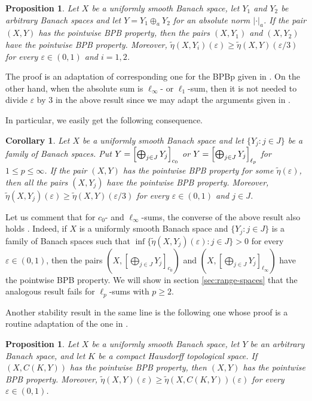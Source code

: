 \documentclass[a4paper,10pt]{amsart}
\theoremstyle{plain}
\newtheorem{corollary}[theorem]{Corollary}
\newtheorem{proposition}[theorem]{Proposition}
\theoremstyle{definition}
\newcommand{\eps}{\varepsilon}
\renewcommand{\geq}{\geqslant}
\renewcommand{\leq}{\leqslant}
\begin{document}
\begin{proposition} \label{prop:abssumrange:pointwise BPB property} Let $X$ be a uniformly smooth Banach space, let $Y_1$ and $Y_2$ be arbitrary Banach spaces and let $Y=Y_1\oplus_a Y_2$ for an absolute norm $|  \cdot  |_a$. If the pair $(X, Y)$ has the pointwise BPB property, then the pairs $(X, Y_1)$ and $(X, Y_2)$ have the pointwise BPB property. Moreover, $\tilde\eta(X,Y_i)(\eps)\geq \tilde\eta(X,Y)(\eps/3)$ for every $\eps\in (0,1)$ and $i=1,2$.
\end{proposition}

The proof is an adaptation of corresponding one for the BPBp given in \cite{CDJM}. On the other hand, when the absolute sum is $\ell_\infty$- or $\ell_1$-sum, then it is not needed to divide $\eps$ by $3$ in the above result since we may adapt the arguments given in \cite[Propositions 2.4 and 2.7]{ACKLM}.

In particular, we easily get the following consequence.
	
\begin{corollary}\label{corollary:sums-range} Let $X$ be a uniformly smooth Banach space and let $\{Y_j\colon j \in J \}$ be a family of Banach spaces. Put $Y = \Bigl[ \bigoplus_{j \in J} Y_j \Bigr]_{c_0}$ or $Y = \Bigl[ \bigoplus_{j \in J} Y_j \Bigr]_{\ell_p}$ for $1 \leq p \leq \infty$. If the pair $(X, Y)$ has the pointwise BPB property for some $\tilde\eta(\eps)$, then all the pairs $(X, Y_j)$ have the pointwise BPB property. Moreover, $\tilde\eta(X,Y_j)(\eps)\geq \tilde\eta(X,Y)(\eps/3)$ for every $\eps\in (0,1)$ and $j \in J$.
\end{corollary}	

Let us comment that for $c_0$- and $\ell_\infty$-sums, the converse of the above result also holds \cite[Proposition 2.9]{DKL}. Indeed, if $X$ is a uniformly smooth Banach space and $\{Y_j\colon j \in J \}$ is a family of Banach spaces
such that $\inf\{\tilde\eta(X,Y_j)(\eps)\colon j\in J\}>0$ for every $\eps\in(0,1)$, then the pairs $\left(X,\left[ \bigoplus_{j \in J} Y_j \right]_{c_0}\right)$ and  $\left(X,\left[ \bigoplus_{j \in J} Y_j \right]_{\ell_\infty}\right)$ have the pointwise BPB property. We will show in section \ref{sec:range-spaces} that the analogous result fails for $\ell_p$-sums with $p\geq 2$.

Another stability result in the same line is the following one whose proof is a routine adaptation of the one in \cite[Proposition~2.8]{ACKLM}.

\begin{proposition}\label{prop:X-CKY}
Let $X$ be a uniformly smooth Banach space, let $Y$ be an arbitrary Banach space, and let $K$ be a compact Hausdorff topological space. If $(X,C(K,Y))$ has the pointwise BPB property, then $(X,Y)$ has the pointwise BPB property. Moreover, $\tilde\eta(X,Y)(\eps)\geq \tilde\eta(X,C(K,Y))(\eps)$ for every $\eps\in (0,1)$.
\end{proposition}
\end{document}

